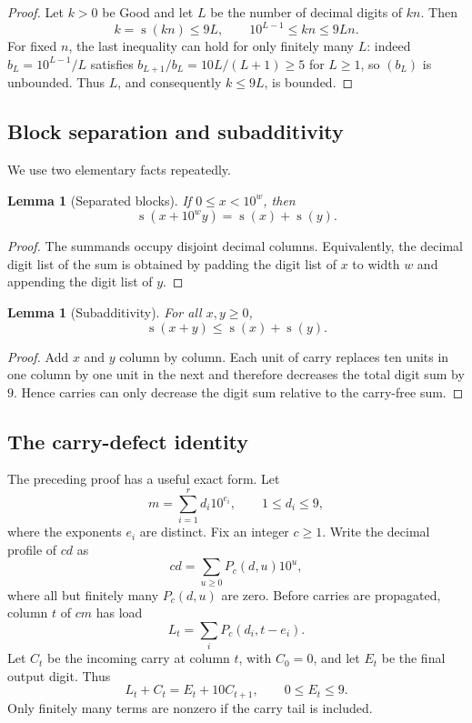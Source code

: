 \documentclass[11pt]{article}
\newtheorem{lemma}[theorem]{Lemma}
\newcommand{\ds}{\operatorname{s}}
\begin{document}
\begin{proof}
Let $k>0$ be Good and let $L$ be the number of decimal digits of $kn$.  Then
\[
 k=\ds(kn)\le 9L,
 \qquad
 10^{L-1}\le kn\le 9Ln.
\]
For fixed $n$, the last inequality can hold for only finitely many $L$: indeed
$b_L=10^{L-1}/L$ satisfies $b_{L+1}/b_L=10L/(L+1)\ge5$ for $L\ge1$, so $(b_L)$ is unbounded.  Thus $L$, and consequently $k\le9L$, is bounded.
\end{proof}

\subsection{Block separation and subadditivity}
We use two elementary facts repeatedly.

\begin{lemma}[Separated blocks]\label{lem:blocksep}
If $0\le x<10^w$, then
\[
  \ds(x+10^w y)=\ds(x)+\ds(y).
\]
\end{lemma}

\begin{proof}
The summands occupy disjoint decimal columns.  Equivalently, the decimal digit list of the sum is obtained by padding the digit list of $x$ to width $w$ and appending the digit list of $y$.
\end{proof}

\begin{lemma}[Subadditivity]\label{lem:subadd}
For all $x,y\ge0$,
\[
  \ds(x+y)\le \ds(x)+\ds(y).
\]
\end{lemma}

\begin{proof}
Add $x$ and $y$ column by column.  Each unit of carry replaces ten units in one column by one unit in the next and therefore decreases the total digit sum by $9$.  Hence carries can only decrease the digit sum relative to the carry-free sum.
\end{proof}

\subsection{The carry-defect identity}
The preceding proof has a useful exact form.  Let
\[
  m=\sum_{i=1}^r d_i10^{e_i},\qquad 1\le d_i\le9,
\]
where the exponents $e_i$ are distinct.  Fix an integer $c\ge1$.  Write the decimal profile of $cd$ as
\[
  cd=\sum_{u\ge0} P_c(d,u)10^u,
\]
where all but finitely many $P_c(d,u)$ are zero.  Before carries are propagated, column $t$ of $cm$ has load
\begin{equation}\label{eq:load}
  L_t=\sum_i P_c(d_i,t-e_i).
\end{equation}
Let $C_t$ be the incoming carry at column $t$, with $C_0=0$, and let $E_t$ be the final output digit.  Thus
\begin{equation}\label{eq:carryrec}
  L_t+C_t=E_t+10C_{t+1},\qquad 0\le E_t\le9.
\end{equation}
Only finitely many terms are nonzero if the carry tail is included.
\end{document}

